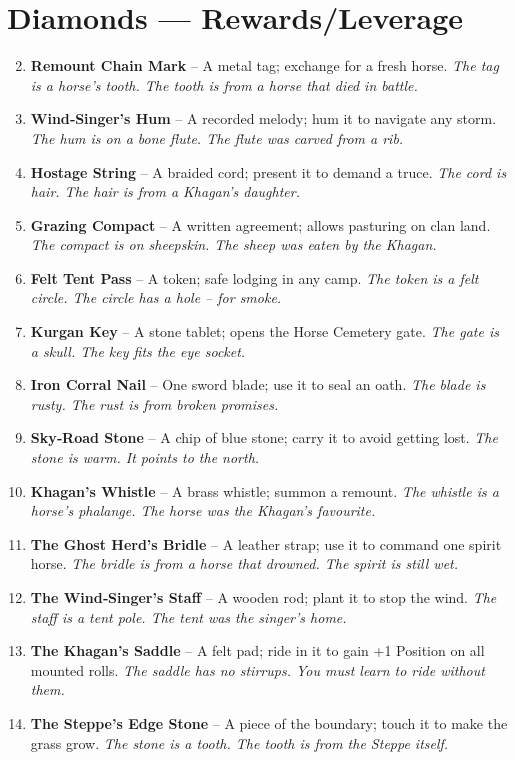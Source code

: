 \documentclass[11pt]{book}
\begin{document}
\section*{Diamonds — Rewards/Leverage}
\begin{enumerate}
\setcounter{enumi}{1}
\item \textbf{Remount Chain Mark} – A metal tag; exchange for a fresh horse. \textit{The tag is a horse’s tooth. The tooth is from a horse that died in battle.}
\item \textbf{Wind‑Singer’s Hum} – A recorded melody; hum it to navigate any storm. \textit{The hum is on a bone flute. The flute was carved from a rib.}
\item \textbf{Hostage String} – A braided cord; present it to demand a truce. \textit{The cord is hair. The hair is from a Khagan’s daughter.}
\item \textbf{Grazing Compact} – A written agreement; allows pasturing on clan land. \textit{The compact is on sheepskin. The sheep was eaten by the Khagan.}
\item \textbf{Felt Tent Pass} – A token; safe lodging in any camp. \textit{The token is a felt circle. The circle has a hole – for smoke.}
\item \textbf{Kurgan Key} – A stone tablet; opens the Horse Cemetery gate. \textit{The gate is a skull. The key fits the eye socket.}
\item \textbf{Iron Corral Nail} – One sword blade; use it to seal an oath. \textit{The blade is rusty. The rust is from broken promises.}
\item \textbf{Sky‑Road Stone} – A chip of blue stone; carry it to avoid getting lost. \textit{The stone is warm. It points to the north.}
\item \textbf{Khagan’s Whistle} – A brass whistle; summon a remount. \textit{The whistle is a horse’s phalange. The horse was the Khagan’s favourite.}
\item[J] \textbf{The Ghost Herd’s Bridle} – A leather strap; use it to command one spirit horse. \textit{The bridle is from a horse that drowned. The spirit is still wet.}
\item[Q] \textbf{The Wind‑Singer’s Staff} – A wooden rod; plant it to stop the wind. \textit{The staff is a tent pole. The tent was the singer’s home.}
\item[K] \textbf{The Khagan’s Saddle} – A felt pad; ride in it to gain +1 Position on all mounted rolls. \textit{The saddle has no stirrups. You must learn to ride without them.}
\item[A] \textbf{The Steppe’s Edge Stone} – A piece of the boundary; touch it to make the grass grow. \textit{The stone is a tooth. The tooth is from the Steppe itself.}
\end{enumerate}
\end{document}
